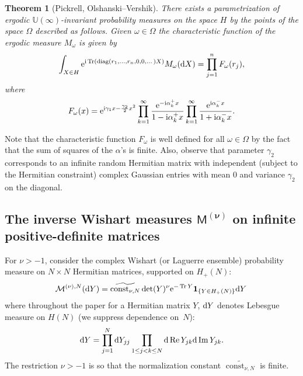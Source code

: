 \documentclass[pdftex]{sigma}
\numberwithin{equation}{section}
\newtheorem{Theorem}{Theorem}[section]
\begin{document}
\begin{Theorem}[Pickrell, Olshanski--Vershik] There exists a parametrization of ergodic $\mathbb{U}(\infty)$-invariant probability measures on the space $H$ by the points of the space $\Omega$ described as follows. Given $\omega \in \Omega$ the characteristic function of the ergodic measure $M_{\omega}$ is given by
\begin{gather*}
\int_{X \in H}^{}{\rm e}^{{\rm i}\operatorname{Tr}(\operatorname{diag}(r_1,\dots,r_n,0,0,\dots)X)}M_{\omega}({\rm d}X)=\prod_{j=1}^{n}F_{\omega}(r_j),
\end{gather*}
where
\begin{gather*}
F_{\omega}(x)={\rm e}^{{\rm i}\gamma_1x-\frac{\gamma_2}{2}x^ 2}\prod_{k=1}^{\infty}\frac{{\rm e}^{-{\rm i}\alpha_k^+x}}{1-{\rm i}\alpha_k^+x}\prod_{k=1}^{\infty}\frac{{\rm e}^{{\rm i}\alpha_k^-x}}{1+{\rm i}\alpha_k^-x} .
\end{gather*}
\end{Theorem}
Note that the characteristic function $F_{\omega}$ is well defined for all $\omega \in \Omega$ by the fact that the sum of squares of the $\alpha$'s is finite. Also, observe that parameter $\gamma_2$ corresponds to an infinite random Hermitian matrix with independent (subject to the Hermitian constraint) complex Gaussian entries with mean 0 and variance $\gamma_2$ on the diagonal.

\subsection[The inverse Wishart measures $\mathsf{M}^{(\nu)}$ on infinite positive-definite matrices]{The inverse Wishart measures $\boldsymbol{\mathsf{M}^{(\nu)}}$ on infinite positive-definite matrices}\label{section1.3}

For $\nu>-1$, consider the complex Wishart (or Laguerre ensemble) probability measure on $N \times N$ Hermitian matrices, supported on $H_+(N)$:
\begin{gather*}
\mathcal{M}^{(\nu),N}({\rm d}Y)=\widetilde{\operatorname{const}_{\nu, N}}\det(Y)^{\nu} {\rm e}^{-\operatorname{Tr}Y}\mathbf{1}_{\{Y \in H_+(N)\}}{\rm d}Y\,
\end{gather*}
where throughout the paper for a Hermitian matrix $Y$, ${\rm d}Y$ denotes Lebesgue measure on $H(N)$ (we suppress dependence on~$N$):
\begin{gather*}
{\rm d}Y=\prod_{j=1}^{N}{\rm d}Y_{jj} \prod_{1 \le j <k \le N}^{}{\rm d} \operatorname{Re} Y_{jk}{\rm d} \operatorname{Im} Y_{jk}.
\end{gather*}
The restriction $\nu>-1$ is so that the normalization constant $\widetilde{\operatorname{const}_{\nu, N}}$ is finite.
\end{document}
